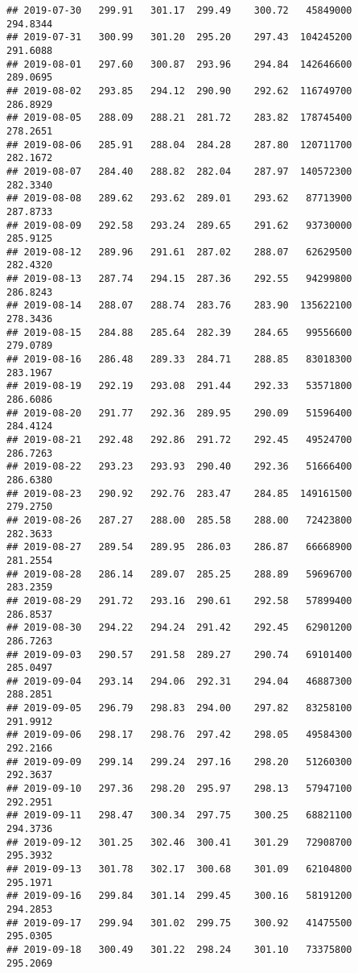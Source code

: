 \documentclass[
]{article}
\begin{document}
\begin{verbatim}
## 2019-07-30   299.91   301.17  299.49    300.72   45849000     294.8344
## 2019-07-31   300.99   301.20  295.20    297.43  104245200     291.6088
## 2019-08-01   297.60   300.87  293.96    294.84  142646600     289.0695
## 2019-08-02   293.85   294.12  290.90    292.62  116749700     286.8929
## 2019-08-05   288.09   288.21  281.72    283.82  178745400     278.2651
## 2019-08-06   285.91   288.04  284.28    287.80  120711700     282.1672
## 2019-08-07   284.40   288.82  282.04    287.97  140572300     282.3340
## 2019-08-08   289.62   293.62  289.01    293.62   87713900     287.8733
## 2019-08-09   292.58   293.24  289.65    291.62   93730000     285.9125
## 2019-08-12   289.96   291.61  287.02    288.07   62629500     282.4320
## 2019-08-13   287.74   294.15  287.36    292.55   94299800     286.8243
## 2019-08-14   288.07   288.74  283.76    283.90  135622100     278.3436
## 2019-08-15   284.88   285.64  282.39    284.65   99556600     279.0789
## 2019-08-16   286.48   289.33  284.71    288.85   83018300     283.1967
## 2019-08-19   292.19   293.08  291.44    292.33   53571800     286.6086
## 2019-08-20   291.77   292.36  289.95    290.09   51596400     284.4124
## 2019-08-21   292.48   292.86  291.72    292.45   49524700     286.7263
## 2019-08-22   293.23   293.93  290.40    292.36   51666400     286.6380
## 2019-08-23   290.92   292.76  283.47    284.85  149161500     279.2750
## 2019-08-26   287.27   288.00  285.58    288.00   72423800     282.3633
## 2019-08-27   289.54   289.95  286.03    286.87   66668900     281.2554
## 2019-08-28   286.14   289.07  285.25    288.89   59696700     283.2359
## 2019-08-29   291.72   293.16  290.61    292.58   57899400     286.8537
## 2019-08-30   294.22   294.24  291.42    292.45   62901200     286.7263
## 2019-09-03   290.57   291.58  289.27    290.74   69101400     285.0497
## 2019-09-04   293.14   294.06  292.31    294.04   46887300     288.2851
## 2019-09-05   296.79   298.83  294.00    297.82   83258100     291.9912
## 2019-09-06   298.17   298.76  297.42    298.05   49584300     292.2166
## 2019-09-09   299.14   299.24  297.16    298.20   51260300     292.3637
## 2019-09-10   297.36   298.20  295.97    298.13   57947100     292.2951
## 2019-09-11   298.47   300.34  297.75    300.25   68821100     294.3736
## 2019-09-12   301.25   302.46  300.41    301.29   72908700     295.3932
## 2019-09-13   301.78   302.17  300.68    301.09   62104800     295.1971
## 2019-09-16   299.84   301.14  299.45    300.16   58191200     294.2853
## 2019-09-17   299.94   301.02  299.75    300.92   41475500     295.0305
## 2019-09-18   300.49   301.22  298.24    301.10   73375800     295.2069

\end{verbatim}
\end{document}
